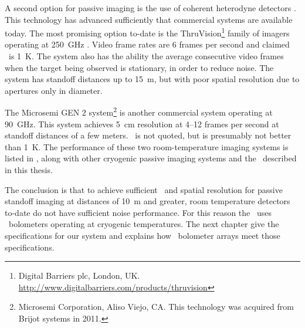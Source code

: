 A second option for passive imaging is the use of coherent heterodyne detectors \cite{rieke_detection_2003,rogalski_terahertz_2011}.
This technology has advanced sufficiently that commercial systems are available today.
The most promising option to-date is the ThruVision\footnote{Digital Barriers plc, London, UK. \url{http://www.digitalbarriers.com/products/thruvision}} family of imagers operating at \SI{250}{\GHz} \cite{mann_first_2009,digital_barriers_extra_????}.
Video frame rates are 6 frames per second and claimed \NETD\ is \SI{1}{\K}.
The system also has the ability the average consecutive video frames when the target being observed is stationary, in order to reduce noise.
The system has standoff distances up to \SI{15}{\m}, but with poor spatial resolution due to apertures only  in diameter.

The Microsemi GEN 2 system\footnote{%
Microsemi Corporation, Aliso Viejo, CA. This technology was acquired from Brijot systems in 2011.}
is another commercial system operating at \SI{90}{\GHz}.
This system achieves \SI{5}{\cm} resolution at 4--12 frames per second at standoff distances of a few meters.
\NETD\ is not quoted, but is presumably not better than \SI{1}{\K}.
The performance of these two room-temperature imaging systems is listed in , along with other cryogenic passive imaging systems and the \Imager\ described in this thesis.

The conclusion is that to achieve sufficient \NETD\ and spatial resolution for passive standoff imaging at distances of \SI{10}{\m} and greater, room temperature detectors to-date do not have sufficient noise performance.
For this reason the \Imager\ uses \TES\ bolometers operating at cryogenic temperatures.
The next chapter give the specifications for our system and explains how \TES\ bolometer arrays meet those specifications.
